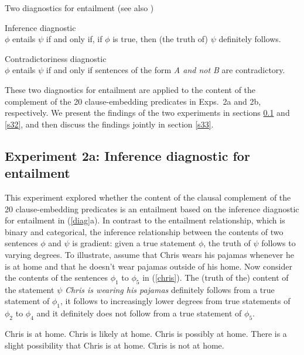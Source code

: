 \documentclass[11pt,fleqn]{article}
\newcommand{\6}{\mbox{$[\hspace*{-.6mm}[$}}
\newcommand{\9}{\mbox{$]\hspace*{-.6mm}]$}}
\begin{document}
\begin{exe}
\ex\label{diag} Two diagnostics for entailment \hfill (see also \citealt[\S3.1]{ccmg90})
\begin{xlist}
\ex  Inference diagnostic \\ $\phi$ entails $\psi$ if and only if, if $\phi$ is true, then (the truth of) $\psi$ definitely follows. 

\ex  Contradictoriness diagnostic \\ $\phi$ entails $\psi$ if and only if sentences of the form {\em A and not B} are contradictory. 

\end{xlist}
\end{exe}
These two diagnostics for entailment are applied to the content of the complement of the 20 clause-embedding predicates in Exps.~2a and 2b, respectively. We present the findings of the two experiments in sections \ref{s31} and \ref{s32}, and then discuss the findings jointly in section \ref{s33}.

\subsection{Experiment 2a: Inference diagnostic for entailment}\label{s31}

This experiment explored whether the content of the clausal complement of the 20 clause-embedding predicates is an entailment based on the inference diagnostic for entailment in (\ref{diag}a). In contrast to the entailment relationship, which is binary and categorical, the inference relationship between the contents of two sentences $\phi$ and $\psi$ is gradient: given a true statement $\phi$, the truth of $\psi$ follows to varying degrees. To illustrate, assume that Chris wears his pajamas whenever he is at home and that he doesn't wear pajamas outside of his home. Now consider the contents of the sentences $\phi_1$ to $\phi_5$ in (\ref{chris}). The (truth of the) content of the statement $\psi$ {\em Chris is wearing his pajamas} definitely follows from a true statement of $\phi_1$, it follows to increasingly lower degrees from true statements of $\phi_2$ to $\phi_4$ and it definitely does not follow from a true statement of $\phi_5$. 

\begin{exe}
\ex\label{chris}
\begin{xlist}
 Chris is at home.
 Chris is likely at home.
 Chris is possibly at home.
 There is a slight possibility that Chris is at home.
 Chris is not at home.
\end{xlist}
\end{exe}
\end{document}
